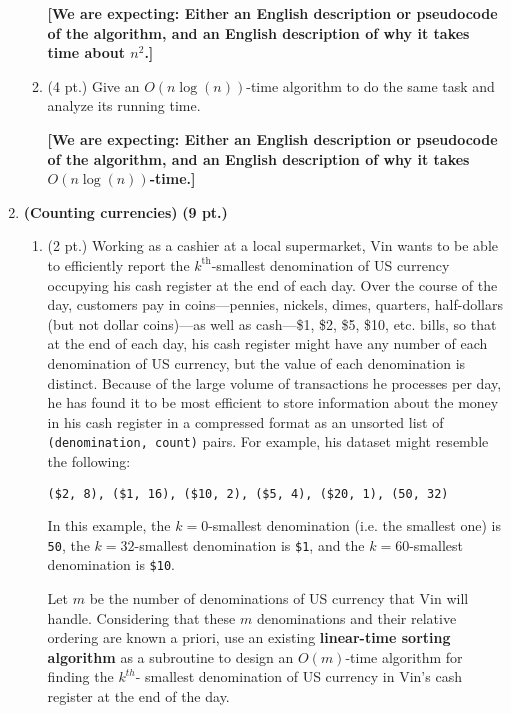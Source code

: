 \documentclass{article}
\begin{document}
\begin{enumerate}
\begin{enumerate}
        \textbf{[We are expecting: Either an English description or pseudocode of
        the algorithm, and an English description of why it takes time about
        $n^2$.]}

      \item (4 pt.) Give an $O(n \log(n))$-time algorithm to do the same task and
        analyze its running time.

        \textbf{[We are expecting: Either an English description or pseudocode of
        the algorithm, and an English description of why it takes
        $O(n \log(n))$-time.]}
    \end{enumerate}

    \newpage

  \item \textbf{(Counting currencies)} \textbf{(9 pt.)}
    \begin{enumerate}
      \item (2 pt.) Working as a cashier at a local supermarket, Vin wants to be
        able to efficiently report the $k^{\textrm{th}}$-smallest denomination of US
        currency occupying his cash register at the end of each day. Over the course
        of the day, customers pay in coins---pennies, nickels, dimes, quarters,
        half-dollars (but not dollar coins)---as well as cash---\$1, \$2, \$5, \$10,
        etc. bills, so that at the end of each day, his cash register might have any
        number of each denomination of US currency, but the value of each 
        denomination is distinct. Because of the large volume of transactions he
        processes per day, he has found it to be most efficient to store information
        about the money in his cash register in a compressed format as an unsorted
        list of \texttt{(denomination, count)} pairs. For example, his dataset might
        resemble the following:

        \begin{center}
          \texttt{(\$2, 8), (\$1, 16), (\$10, 2), (\$5, 4), (\$20, 1), (50\textcent, 32)}
        \end{center}

        In this example, the $k=0$-smallest denomination (i.e. the smallest one) is
        \texttt{50\textcent}, the $k=32$-smallest denomination is \texttt{\$1}, and
        the $k=60$-smallest denomination is \texttt{\$10}.
        
        Let $m$ be the number of denominations of US currency that Vin will handle.
        Considering that these $m$ denominations and their relative ordering are
        known a priori, use an existing \textbf{linear-time sorting algorithm} as a
        subroutine to design an $O(m)$-time algorithm for finding the $k^{th}$-
        smallest denomination of US currency in Vin's cash register at the end of
        the day.


\end{enumerate}
\end{enumerate}
\end{document}
